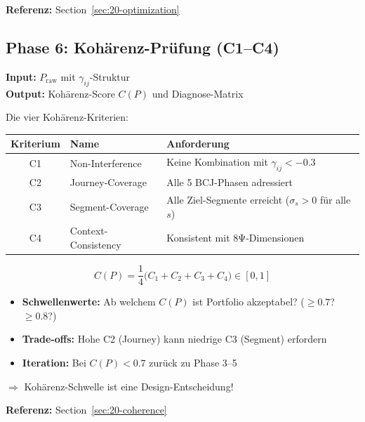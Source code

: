 \textbf{Referenz:} Section~\ref{sec:20-optimization}

\subsection{Phase 6: Kohärenz-Prüfung (C1--C4)}
\label{sec:20-phase6}

\textbf{Input:} $P_{\text{raw}}$ mit $\gamma_{ij}$-Struktur\\
\textbf{Output:} Kohärenz-Score $C(P)$ und Diagnose-Matrix

Die vier Kohärenz-Kriterien:

\begin{center}
\renewcommand{\arraystretch}{1.3}
\begin{tabular}{@{}clp{6cm}@{}}
\toprule
\textbf{Kriterium} & \textbf{Name} & \textbf{Anforderung} \\
\midrule
C1 & Non-Interference & Keine Kombination mit $\gamma_{ij} < -0.3$ \\
C2 & Journey-Coverage & Alle 5 BCJ-Phasen adressiert \\
C3 & Segment-Coverage & Alle Ziel-Segmente erreicht ($\sigma_s > 0$ für alle $s$) \\
C4 & Context-Consistency & Konsistent mit 8Ψ-Dimensionen \\
\bottomrule
\end{tabular}
\end{center}

\begin{equation}
C(P) = \frac{1}{4}\bigl(C_1 + C_2 + C_3 + C_4\bigr) \in [0, 1]
\end{equation}

\begin{tcolorbox}[colback=orange!5!white, colframe=orange!75!black,
    title=\textbf{Variabilität in Phase 6}]
\begin{itemize}[nosep]
\item \textbf{Schwellenwerte:} Ab welchem $C(P)$ ist Portfolio akzeptabel? ($\geq 0.7$? $\geq 0.8$?)
\item \textbf{Trade-offs:} Hohe C2 (Journey) kann niedrige C3 (Segment) erfordern
\item \textbf{Iteration:} Bei $C(P) < 0.7$ zurück zu Phase 3--5
\end{itemize}
$\Rightarrow$ Kohärenz-Schwelle ist eine Design-Entscheidung!
\end{tcolorbox}

\textbf{Referenz:} Section~\ref{sec:20-coherence}

